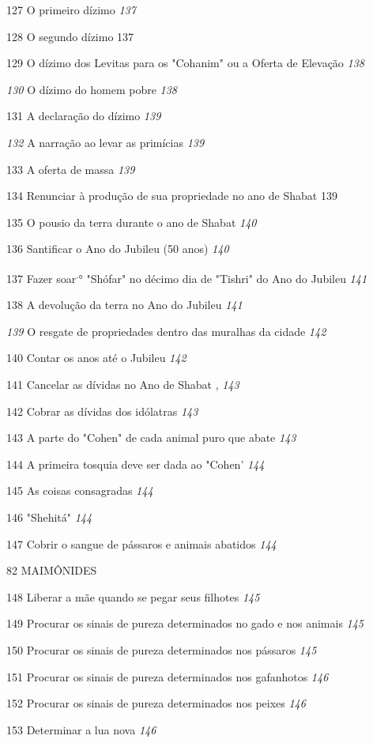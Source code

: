 127 O primeiro dízimo \emph{137}

128 O segundo dízimo 137

129 O dízimo dos Levitas para os "Cohanim" ou a Oferta de Elevação
\emph{138}

\emph{130} O dízimo do homem pobre \emph{138}

131 A declaração do dízimo \emph{139}

\emph{132} A narração ao levar as primícias \emph{139}

133 A oferta de massa \emph{139}

134 Renunciar à produção de sua propriedade no ano de Shabat 139

135 O pousio da terra durante o ano de Shabat \emph{140}

136 Santificar o Ano do Jubileu (50 anos) \emph{140}

137 Fazer soar\textsuperscript{.}° "Shófar" no décimo dia de "Tishri" do
Ano do Jubileu \emph{141}

138 A devolução da terra no Ano do Jubileu \emph{141}

\emph{139} O resgate de propriedades dentro das muralhas da cidade
\emph{142}

140 Contar os anos até o Jubileu \emph{142}

141 Cancelar as dívidas no Ano de Shabat , \emph{143}

142 Cobrar as dívidas dos idólatras \emph{143}

143 A parte do "Cohen" de cada animal puro que abate \emph{143}

144 A primeira tosquia deve ser dada ao "Cohen' \emph{144}

145 As coisas consagradas \emph{144}

146 "Shehitá" \emph{144}

147 Cobrir o sangue de pássaros e animais abatidos \emph{144}

82 MAIMÔNIDES

148 Liberar a mãe quando se pegar seus filhotes \emph{145}

149 Procurar os sinais de pureza determinados no gado e nos animais
\emph{145}

150 Procurar os sinais de pureza determinados nos pássaros \emph{145}

151 Procurar os sinais de pureza determinados nos gafanhotos \emph{146}

152 Procurar os sinais de pureza determinados nos peixes \emph{146}

153 Determinar a lua nova \emph{146}

